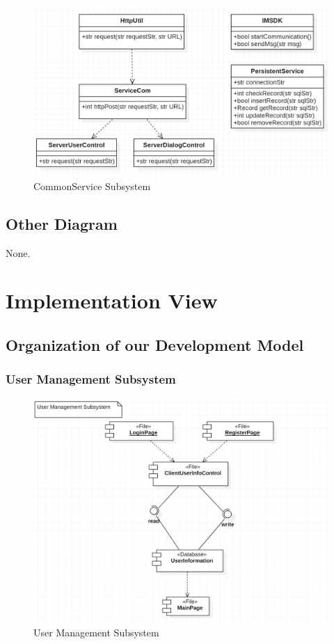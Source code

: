 \documentclass[10pt]{article}
\begin{document}
\begin{figure}[H]
    \centering
    
    \includegraphics[width=14cm]{commonmanagement.png}
    \caption{CommonService Subsystem}
    \label{CommonService Subsystem}
\end{figure}

\subsection{Other Diagram}
None.

\section{Implementation View}

\subsection{Organization of our Development Model}
\subsubsection{User Management Subsystem}

\begin{figure}[H]
    \centering
    
    \includegraphics[width=14cm]{userbefore.png}
    \caption{User Management Subsystem}
    \label{User Management Subsystem}
\end{figure}
\end{document}
